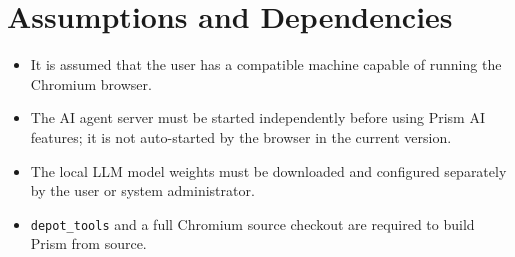 \section{Assumptions and Dependencies}
\begin{itemize}[leftmargin=*]
    \item It is assumed that the user has a compatible machine capable of running the Chromium browser.
    \item The AI agent server must be started independently before using Prism AI features; it is not auto-started by the browser in the current version.
    \item The local LLM model weights must be downloaded and configured separately by the user or system administrator.
    \item \texttt{depot\_tools} and a full Chromium source checkout are required to build Prism from source.
\end{itemize}
